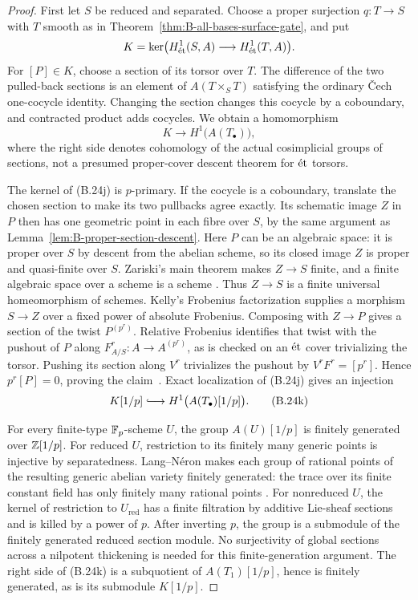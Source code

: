 \begin{proof}
First let \(S\) be reduced and separated.  Choose a proper
surjection \(q:T\to S\) with \(T\) smooth as in
Theorem~\ref{thm:B-all-bases-surface-gate}, and put
\[
 K=\ker\bigl(H^1_{\mathrm{\acute et}}(S,A)\longrightarrow
                        H^1_{\mathrm{\acute et}}(T,A)\bigr).
\]
For \([P]\in K\), choose a section of its torsor over
\(T\).  The difference of the two pulled-back sections is
an element of \(A(T\times_ST)\) satisfying the ordinary
\v Cech one-cocycle identity.  Changing the section changes
this cocycle by a coboundary, and contracted product adds
cocycles.  We obtain a homomorphism
\[
 K\longrightarrow H^1\bigl(A(T_\bullet)\bigr),     \tag{B.24j}
\]
where the right side denotes cohomology of the actual
cosimplicial groups of sections, not a presumed proper-cover
descent theorem for \(\mathrm{\acute et}\) torsors.

The kernel of (B.24j) is \(p\)-primary.  If the cocycle is
a coboundary, translate the chosen section to make its two
pullbacks agree exactly.  Its schematic image \(Z\) in
\(P\) then has one geometric point in each fibre over
\(S\), by the same argument as
Lemma~\ref{lem:B-proper-section-descent}.
Here \(P\) can be an algebraic space: it is proper over
\(S\) by descent from the abelian scheme, so its closed
image \(Z\) is proper and quasi-finite over \(S\).
Zariski's main theorem makes \(Z\to S\) finite, and a
finite algebraic space over a scheme is a scheme
\cite[Lemmas~76.34.3 and 67.45.3]{BStacksFiniteSpaces}.
Thus \(Z\to S\) is a finite universal homeomorphism of
schemes.  Kelly's Frobenius factorization supplies a morphism
\(S\to Z\) over a fixed power of absolute Frobenius.
Composing with \(Z\to P\) gives a section of the twist
\(P^{(p^r)}\).  Relative Frobenius identifies that twist
with the pushout of \(P\) along
\(F^r_{A/S}:A\to A^{(p^r)}\), as is checked on an
\(\mathrm{\acute et}\) cover trivializing the torsor.  Pushing its section
along \(V^r\) trivializes the pushout by
\(V^rF^r=[p^r]\).  Hence \(p^r[P]=0\), proving the
claim~\cite[Proposition~3 and Corollary~20]{BKelly2018}.
Exact localization of (B.24j) gives an injection
\[
 K[1/p]\lhook\joinrel\longrightarrow
             H^1\bigl(A(T_\bullet)[1/p]\bigr).     \tag{B.24k}
\]

For every finite-type \(\mathbb F_p\)-scheme \(U\), the group
\(A(U)[1/p]\) is finitely generated over \(\mathbb Z[1/p]\).
For reduced \(U\), restriction to its finitely many generic
points is injective by separatedness.  Lang--N\'eron makes
each group of rational points of the resulting generic
abelian variety finitely generated: the trace over its finite
constant field has only finitely many rational points
\cite[Theorems~2.1 and 7.1]{BConrad2006}.
For nonreduced \(U\), the kernel of restriction to
\(U_{\mathrm{red}}\) has a finite filtration by additive
Lie-sheaf sections and is killed by a power of \(p\).
After inverting \(p\), the group is a submodule of the
finitely generated reduced section module.  No surjectivity
of global sections across a nilpotent thickening is needed
for this finite-generation argument.  The right side of
(B.24k) is a subquotient of \(A(T_1)[1/p]\), hence is
finitely generated, as is its submodule \(K[1/p]\).


\end{proof}
